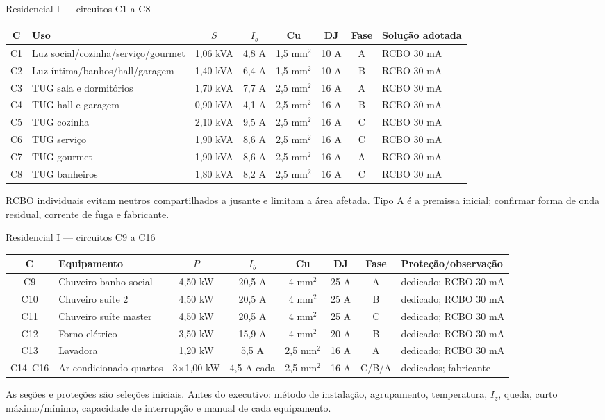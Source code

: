 \begin{frame}[shrink=6]{Residencial I — circuitos C1 a C8}
\scriptsize
\begin{tabularx}{\textwidth}{c p{3.25cm} c c c c c X}
\toprule
C & Uso & $S$ & $I_b$ & Cu & DJ & Fase & Solução adotada\\
\midrule
C1 & Luz social/cozinha/serviço/gourmet & 1,06 kVA & 4,8 A & 1,5 mm$^2$ & 10 A & A & RCBO 30 mA\\
C2 & Luz íntima/banhos/hall/garagem & 1,40 kVA & 6,4 A & 1,5 mm$^2$ & 10 A & B & RCBO 30 mA\\
C3 & TUG sala e dormitórios & 1,70 kVA & 7,7 A & 2,5 mm$^2$ & 16 A & A & RCBO 30 mA\\
C4 & TUG hall e garagem & 0,90 kVA & 4,1 A & 2,5 mm$^2$ & 16 A & B & RCBO 30 mA\\
C5 & TUG cozinha & 2,10 kVA & 9,5 A & 2,5 mm$^2$ & 16 A & C & RCBO 30 mA\\
C6 & TUG serviço & 1,90 kVA & 8,6 A & 2,5 mm$^2$ & 16 A & C & RCBO 30 mA\\
C7 & TUG gourmet & 1,90 kVA & 8,6 A & 2,5 mm$^2$ & 16 A & A & RCBO 30 mA\\
C8 & TUG banheiros & 1,80 kVA & 8,2 A & 2,5 mm$^2$ & 16 A & C & RCBO 30 mA\\
\bottomrule
\end{tabularx}
\begin{caixaObs}
RCBO individuais evitam neutros compartilhados a jusante e limitam a área afetada. Tipo A é a premissa inicial; confirmar forma de onda residual, corrente de fuga e fabricante.
\end{caixaObs}
\end{frame}

\begin{frame}[shrink=6]{Residencial I — circuitos C9 a C16}
\scriptsize
\begin{tabularx}{\textwidth}{c p{3.15cm} c c c c c X}
\toprule
C & Equipamento & $P$ & $I_b$ & Cu & DJ & Fase & Proteção/observação\\
\midrule
C9 & Chuveiro banho social & 4,50 kW & 20,5 A & 4 mm$^2$ & 25 A & A & dedicado; RCBO 30 mA\\
C10 & Chuveiro suíte 2 & 4,50 kW & 20,5 A & 4 mm$^2$ & 25 A & B & dedicado; RCBO 30 mA\\
C11 & Chuveiro suíte master & 4,50 kW & 20,5 A & 4 mm$^2$ & 25 A & C & dedicado; RCBO 30 mA\\
C12 & Forno elétrico & 3,50 kW & 15,9 A & 4 mm$^2$ & 20 A & B & dedicado; RCBO 30 mA\\
C13 & Lavadora & 1,20 kW & 5,5 A & 2,5 mm$^2$ & 16 A & A & dedicado; RCBO 30 mA\\
C14--C16 & Ar-condicionado quartos & 3$\times$1,00 kW & 4,5 A cada & 2,5 mm$^2$ & 16 A & C/B/A & dedicados; fabricante\\
\bottomrule
\end{tabularx}
\begin{caixaAt}
As seções e proteções são seleções iniciais. Antes do executivo: método de instalação, agrupamento, temperatura, $I_z$, queda, curto máximo/mínimo, capacidade de interrupção e manual de cada equipamento.
\end{caixaAt}
\end{frame}

